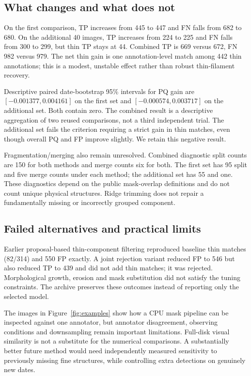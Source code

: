 \documentclass[sigconf]{acmart}
\begin{document}
\subsection{What changes and what does not}
On the first comparison, TP increases from 445 to 447 and FN falls from 682 to 680. On the additional 40 images, TP increases from 224 to 225 and FN falls from 300 to 299, but thin TP stays at 44. Combined TP is 669 versus 672, FN 982 versus 979. The net thin gain is one annotation-level match among 442 thin annotations; this is a modest, unstable effect rather than robust thin-filament recovery.

Descriptive paired date-bootstrap 95\% intervals for PQ gain are $[-0.001377,0.004161]$ on the first set and $[-0.000574,0.003717]$ on the additional set. Both contain zero. The combined result is a descriptive aggregation of two reused comparisons, not a third independent trial. The additional set fails the criterion requiring a strict gain in thin matches, even though overall PQ and FP improve slightly. We retain this negative result.

Fragmentation/merging also remain unresolved. Combined diagnostic split counts are 150 for both methods and merge counts six for both. The first set has 95 split and five merge counts under each method; the additional set has 55 and one. These diagnostics depend on the public mask-overlap definitions and do not count unique physical structures. Ridge trimming does not repair a fundamentally missing or incorrectly grouped component.
\subsection{Failed alternatives and practical limits}
Earlier proposal-based thin-component filtering reproduced baseline thin matches (82/314) and 550 FP exactly. A joint rejection variant reduced FP to 546 but also reduced TP to 439 and did not add thin matches; it was rejected. Morphological growth, erosion and mask substitution did not satisfy the tuning constraints. The archive preserves these outcomes instead of reporting only the selected model.

The images in Figure~\ref{fig:examples} show how a CPU mask pipeline can be inspected against one annotator, but annotator disagreement, observing conditions and downsampling remain important limitations. Full-disk visual similarity is not a substitute for the numerical comparisons. A substantially better future method would need independently measured sensitivity to previously missing fine structures, while controlling extra detections on genuinely new dates.
\end{document}
